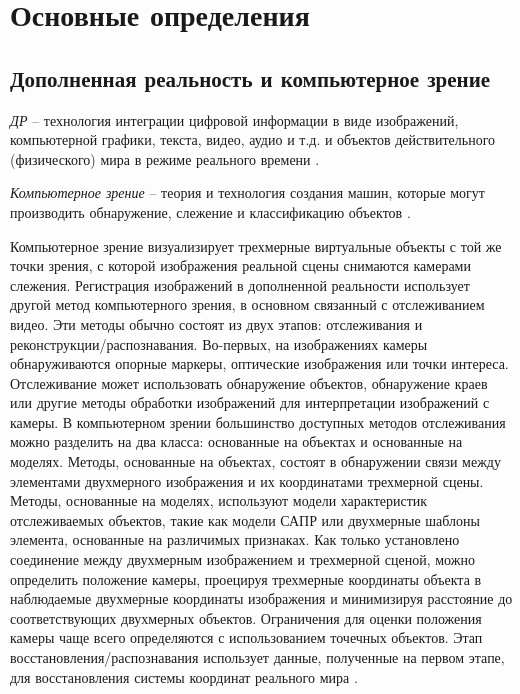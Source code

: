 \section{Основные определения}

\subsection{Дополненная реальность и компьютерное зрение}

\textit{ДР} -- технология интеграции цифровой информации в виде изображений, компьютерной графики, текста, видео, аудио и т.д. и объектов действительного (физического) мира в режиме реального времени \cite{tech-ar}.

\textit{Компьютерное зрение} -- теория и технология создания машин, которые могут производить обнаружение, слежение и классификацию объектов \cite{comp_vision}. 

Компьютерное зрение визуализирует трехмерные виртуальные объекты с той же точки зрения, с которой изображения реальной сцены снимаются камерами слежения. Регистрация изображений в дополненной реальности использует другой метод компьютерного зрения, в основном связанный с отслеживанием видео. Эти методы обычно состоят из двух этапов: отслеживания и реконструкции/распознавания. Во-первых, на изображениях камеры обнаруживаются опорные маркеры, оптические изображения или точки интереса. Отслеживание может использовать обнаружение объектов, обнаружение краев или другие методы обработки изображений для интерпретации изображений с камеры. В компьютерном зрении большинство доступных методов отслеживания можно разделить на два класса: основанные на объектах и основанные на моделях. Методы, основанные на объектах, состоят в обнаружении связи между элементами двухмерного изображения и их координатами трехмерной сцены. Методы, основанные на моделях, используют модели характеристик отслеживаемых объектов, такие как модели САПР \cite{cad} или двухмерные шаблоны элемента, основанные на различимых признаках. Как только установлено соединение между двухмерным изображением и трехмерной сценой, можно определить положение камеры, проецируя трехмерные координаты объекта в наблюдаемые двухмерные координаты изображения и минимизируя расстояние до соответствующих двухмерных объектов. Ограничения для оценки положения камеры чаще всего определяются с использованием точечных объектов. Этап восстановления/распознавания использует данные, полученные на первом этапе, для восстановления системы координат реального мира \cite{ar_overview}.

